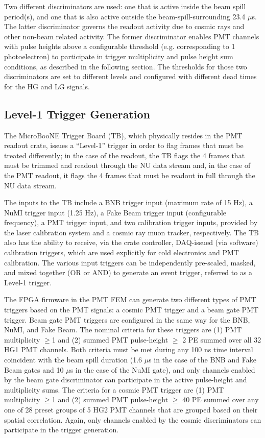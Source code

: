 Two different discriminators are used: one that is active inside the beam spill period(s), and one that is also active outside the beam-spill-surrounding 23.4 $\mu$s. The latter discriminator governs the readout activity due to cosmic rays and other non-beam related activity. The former discriminator enables PMT channels with pulse heights above a configurable threshold (e.g. corresponding to 1 photoelectron)  to participate in trigger multiplicity and pulse height sum conditions, as described in the following section. The thresholds for those two discriminators are set to different levels and configured with different dead times for the HG and LG signals.

\subsection{Level-1 Trigger Generation}
\label{sec:trigger}

The MicroBooNE Trigger Board (TB), which physically resides in the PMT readout crate, issues a ``Level-1'' trigger in order to flag frames that must be treated differently; in the case of the \lartpc readout, the TB flags the 4 frames that must be trimmed and readout through the NU data stream and, in the case of the PMT readout, it flags the 4 frames that must be readout in full through the NU data stream.

The inputs to the TB include a BNB trigger input (maximum rate of 15 Hz), a NuMI trigger input (1.25 Hz), a Fake Beam trigger input (configurable frequency), a PMT trigger input, and two calibration trigger inputs, provided by the laser calibration system and a cosmic ray muon tracker, respectively. The TB also has the ability to receive, via the crate controller, DAQ-issued (via software) calibration triggers, which are used explicitly for cold electronics and PMT calibration. The various input triggers can be independently pre-scaled, masked, and mixed together (OR or AND) to generate an event trigger, referred to as a Level-1 trigger.

The FPGA firmware in the PMT FEM can generate two different types of PMT triggers based on the PMT signals: a cosmic PMT trigger and a beam gate PMT trigger. Beam gate PMT triggers are configured in the same way for the BNB, NuMI, and Fake Beam. The nominal criteria for these triggers are (1) PMT multiplicity $\ge$1 and (2) summed PMT pulse-height $\ge$ 2 PE summed over all 32 HG1 PMT channels. Both criteria must be met during any 100 ns time interval coincident with the beam spill duration (1.6 $\mu$s in the case of the BNB and Fake Beam gates and 10 $\mu$s in the case of the NuMI gate), and only channels enabled by the beam gate discriminator can participate in the active pulse-height and multiplicity sums. The criteria for a cosmic PMT trigger are (1) PMT multiplicity $\ge$1 and (2) summed PMT pulse-height $\ge$ 40 PE summed over any one of 28 preset groups of 5 HG2 PMT channels that are grouped based on their spatial correlation. Again, only channels enabled by the cosmic discriminators can participate in the trigger generation.

